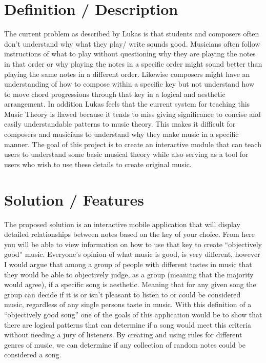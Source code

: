 \documentclass[onecolumn, draftclsnofoot,10pt, compsoc]{IEEEtran}
\begin{document}
\newpage
{}
\tableofcontents
\clearpage

\section{Definition / Description}
	The current problem as described by Lukas is that students and composers often don't understand why what they play/ write sounds good.  Musicians often follow instructions of what to play without questioning why they are playing the notes in that order or why playing the notes in a specific order might sound better than playing the same notes in a different order. Likewise composers might have an understanding of how to compose within a specific key but not understand how to move chord progressions through that key in a logical and aesthetic arrangement. In addition Lukas feels that the current system for teaching this Music Theory is flawed because it tends to miss giving significance to concise and easily understandable patterns to music theory. This makes it difficult for composers and musicians to understand why they make music in a specific manner. The goal of this project is to create an interactive module that can teach users to understand some basic musical theory while also serving as a tool for users who wish to use these details to create original music.

\section{Solution / Features}
	The proposed solution is an interactive mobile application that will display detailed relationships between notes based on the key of your choice. From here you will be able to view information on how to use that key to create “objectively good” music. Everyone's opinion of what music is good, is very different, however I would argue that among a group of people with different tastes in music that they would be able to objectively judge, as a group (meaning that the majority would agree), if a specific song is aesthetic. Meaning that for any given song the group can decide if it is or isn't pleasant to listen to or could be considered music, regardless of any single persons taste in music. With this definition of a “objectively good song” one of the goals of this application would be to show that there are logical patterns that can determine if a song would meet this criteria without needing a jury of listeners. By creating and using rules for different genres of music, we can determine if any collection of random notes could be considered a song.
\end{document}
